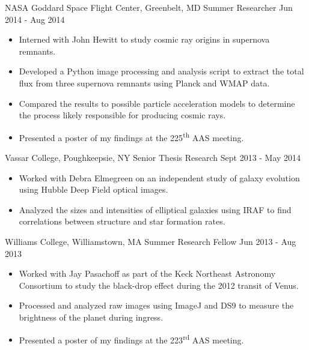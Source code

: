 \documentclass[]{awesome-cv}
\begin{document}
\begin{cventries}
	\vspace{-6mm}
	\cventry
	{NASA Goddard Space Flight Center, Greenbelt, MD}
	{Summer Researcher}
	{Jun 2014 - Aug 2014}
	{}
	{\vspace{-3mm}
		\begin{itemize}
			\item Interned with John Hewitt to study cosmic ray origins in supernova remnants. \vspace{0.7mm}
			\item Developed a Python image processing and analysis script to extract the total flux from three supernova remnants using Planck and WMAP data. \vspace{0.7mm}
			\item Compared the results to possible particle acceleration models to determine the process likely responsible for producing cosmic rays. \vspace{0.7mm}
			\item Presented a poster of my findings at the 225\textsuperscript{th} AAS meeting. 
		\end{itemize}
	}
	
	\vspace{-6mm}
	\cventry
	{Vassar College, Poughkeepsie, NY}
	{Senior Thesis Research}
	{Sept 2013 - May 2014}
	{}
	{\vspace{-3mm}
		\begin{itemize}
			\item Worked with Debra Elmegreen on an independent study of galaxy evolution using Hubble Deep Field optical images. \vspace{0.7mm}
			\item Analyzed the sizes and intensities of elliptical galaxies using IRAF to find correlations between structure and star formation rates. 
		\end{itemize}
	}
	
	\vspace{-6mm}
	\cventry
	{Williams College, Williamstown, MA}
	{Summer Research Fellow}
	{Jun 2013 - Aug 2013}
	{}
	{\vspace{-3mm}
		\begin{itemize}
			\item Worked with Jay Pasachoff as part of the Keck Northeast Astronomy Consortium to study the black-drop effect during the 2012 transit of Venus. \vspace{0.7mm}
			\item Processed and analyzed raw images using ImageJ and DS9 to measure the brightness of the planet during ingress. \vspace{0.7mm}
			\item Presented a poster of my findings at the 223\textsuperscript{rd} AAS meeting. 
		\end{itemize}}
\end{cventries}
\end{document}
